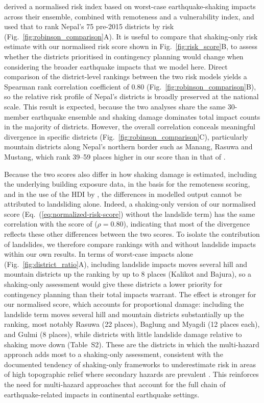 \documentclass[nhess, manuscript]{copernicus}
\begin{document}
\citet{Robinson2018} derived a normalised risk index based on worst-case earthquake-shaking impacts across their ensemble, combined with remoteness and a vulnerability index, and used that to rank Nepal's 75 pre-2015 districts by risk (Fig.~\ref{fig:robinson_comparison}A). It is useful to compare that shaking-only risk estimate with our normalised risk score shown in Fig.~\ref{fig:risk_score}B, to assess whether the districts prioritised in contingency planning would change when considering the broader earthquake impacts that we model here. Direct comparison of the district-level rankings between the two risk models yields a Spearman rank correlation coefficient of 0.80 (Fig.~\ref{fig:robinson_comparison}B), so the relative risk profile of Nepal's districts is broadly preserved at the national scale. This result is expected, because the two analyses share the same 30-member earthquake ensemble and shaking damage dominates total impact counts in the majority of districts. However, the overall correlation conceals meaningful divergence in specific districts (Fig.~\ref{fig:robinson_comparison}C), particularly mountain districts along Nepal's northern border such as Manang, Rasuwa and Mustang, which rank 39--59 places higher in our score than in that of \citet{Robinson2018}. 

Because the two scores also differ in how shaking damage is estimated, including the underlying building exposure data, in the basis for the remoteness scoring, and in the use of the HDI by \citet{Robinson2018}, the differences in modelled output cannot be attributed to landsliding alone. Indeed, a shaking-only version of our normalised score (Eq.~(\ref{eq:normalized-risk-score}) without the landslide term) has the same correlation with the score of \citet{Robinson2018} ($\rho = 0.80$), indicating that most of the divergence reflects these other differences between the two scores. To isolate the contribution of landslides, we therefore compare rankings with and without landslide impacts within our own results. In terms of worst-case impacts alone (Fig.~\ref{fig:district_ratio}A), including landslide impacts moves several hill and mountain districts up the ranking by up to 8 places (Kalikot and Bajura), so a shaking-only assessment would give these districts a lower priority for contingency planning than their total impacts warrant. The effect is stronger for our normalised score, which accounts for proportional damage: including the landslide term moves several hill and mountain districts substantially up the ranking, most notably Rasuwa (22 places), Baglung and Myagdi (12 places each), and Gulmi (8 places), while districts with little landslide damage relative to shaking move down (Table~S2). These are the districts in which the multi-hazard approach adds most to a shaking-only assessment, consistent with the documented tendency of shaking-only frameworks to underestimate risk in areas of high topographic relief where secondary hazards are prevalent \citep{Budimir2014}. This reinforces the need for multi-hazard approaches that account for the full chain of earthquake-related impacts in continental earthquake settings.
\end{document}
